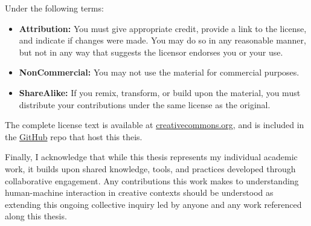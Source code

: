 \vspace{0.5cm}

Under the following terms:

\begin{itemize}
\item \textbf{Attribution:} You must give appropriate credit, provide a link to the license, and indicate if changes were made. You may do so in any reasonable manner, but not in any way that suggests the licensor endorses you or your use.
\item \textbf{NonCommercial:} You may not use the material for commercial purposes.
\item \textbf{ShareAlike:} If you remix, transform, or build upon the material, you must distribute your contributions under the same license as the original.
\end{itemize}

\vspace{0.5cm}

The complete license text is available at \href{https://creativecommons.org/licenses/by-nc-sa/4.0/}{creativecommons.org}, and is included in the \href{https://github.com/jmuozan/ArsPostFaber-Thesis/blob/main/LICENSE.md}{GitHub} repo that host this theis.

\vspace{0.5cm}

Finally, I acknowledge that while this thesis represents my individual academic work, it builds upon shared knowledge, tools, and practices developed through collaborative engagement. Any contributions this work makes to understanding human-machine interaction in creative contexts should be understood as extending this ongoing collective inquiry led by anyone and any work referenced along this thesis.

\clearpage
